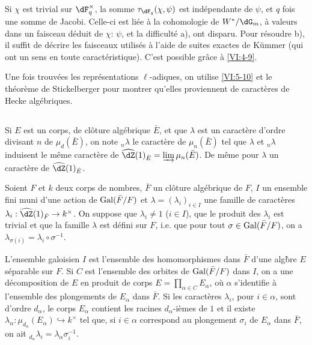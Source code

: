 Si $\chi$ est trivial sur $\dF_q^\times$, la somme $\tau_{\dF_q}(\chi,\psi)$ 
est ind\'ependante de $\psi$, et $q$ fois une somme de Jacobi. Celle-ci est 
li\'ee \`a la cohomologie de $W^\ast/\dG_m$, \`a valeurs dans un faisceau 
d\'eduit de $\chi$: $\psi$, et la difficult\'e a), ont disparu. Pour 
r\'esoudre b), il suffit de d\'ecrire les faisceaux utilis\'es \`a l'aide de 
suites exactes de K\"ummer (qui ont un sens en toute caract\'eristique). C'est 
possible gr\^ace \`a \ref{VI:4-9}. 

Une fois trouv\'ees les repr\'esentations $\ell$-adiques, on utilise 
\ref{VI:5-10} et le th\'eor\`eme de Stickelberger pour montrer qu'elles 
proviennent de caract\`eres de Hecke alg\'ebriques. 





\subsection{}\label{VI:6-1}

Si $E$ est un corps, de cl\^oture alg\'ebrique $\bar E$, et que $\lambda$ est 
un caract\`ere d'ordre divisant $n$ de $\mu_d(\bar E)$, on note $_n\lambda$ le 
caract\`ere de $\mu_n(\bar E)$ tel que $\lambda$ et $_n \lambda$ induisent le 
m\^eme caract\`ere de $\widehat\dZ(1)_{\bar E} = \varinjlim \mu_n(\bar E)$. De 
m\^eme pour $\lambda$ un caract\`ere de $\widehat\dZ(1)_{\bar E}$. 

Soient $F$ et $k$ deux corps de nombres, $\bar F$ un cl\^oture alg\'ebrique de 
$F$, $I$ un ensemble fini muni d'une action de $\operatorname{Gal}(\bar F/F)$ et 
$\lambda=(\lambda_i)_{i\in I}$ une famille de caract\`eres 
$\lambda_i:\widehat\dZ(1)_{\bar F} \to k^\times$. On suppose que 
$\lambda_i\ne 1$ ($i\in I$), que le produit des $\lambda_i$ est trivial et que 
la famille $\lambda$ est d\'efini sur $F$, i.e. que pour tout 
$\sigma\in \operatorname{Gal}(\bar F/F)$, on a 
$\lambda_{\sigma(i)}=\lambda_i\circ \sigma^{-1}$. 

L'ensemble galoisien $I$ est l'ensemble des homomorphismes dans $\bar F$ d'une 
alg\`bre $E$ s\'eparable sur $F$. Si $C$ est l'ensemble des orbites de 
$\operatorname{Gal}(\bar F/F)$ dans $I$, on a une d\'ecomposition de $E$ en produit de corps 
$E=\prod_{\alpha\in C} E_\alpha$, o\`u $\alpha$ s'identifie \`a l'ensemble des 
plongements de $E_\alpha$ dans $\bar F$. Si les caract\`eres $\lambda_i$, pour 
$i\in \alpha$, sont d'ordre $d_\alpha$, le corps $E_\alpha$ contient les 
racines $d_\alpha$-i\`emes de $1$ et il existe 
$\lambda_\alpha:\mu_{d_\alpha}(E_\alpha) \hookrightarrow k^\times$  tel que, si 
$i\in \alpha$ correspond au plongement $\sigma_i$ de $E_\alpha$ dans $\bar F$, 
on ait $_{d_\alpha} \lambda_i = \lambda_\alpha \sigma_i^{-1}$. 





